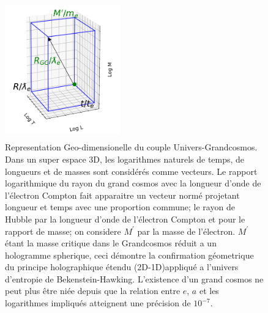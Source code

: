 \documentclass[a4paper,12pt]{article}
\begin{document}
\begin{appendix}
\begin{figure}
\centering
\includegraphics[width=5cm,height=6cm]{./figures/triaxis.png} 
\caption[Representation Geo-dimensionelle du couple Univers-Grandcosmos]{Representation Geo-dimensionelle du couple Univers-Grandcosmos. Dans un super espace 3D, les logarithmes naturels de temps, de longueurs et de masses sont considérés comme vecteurs. Le rapport logarithmique du rayon du grand cosmos avec la longueur d'onde de l'électron Compton fait apparaitre un vecteur normé projetant longueur et temps avec une proportion commune; le rayon de Hubble par la longueur d'onde de l'électron Compton et pour le rapport de masse; on considere $M^{\prime}$ par la masse de l'électron. $M^{\prime}$ étant la masse critique dans le Grandcosmos réduit a un hologramme spherique, ceci démontre la confirmation géometrique du principe holographique étendu (2D-1D)appliqué a l'univers d'entropie de Bekenstein-Hawking. L'existence d'un grand cosmos ne peut plus \^etre niée depuis que la relation entre $e$, $a$ et les logarithmes impliqués atteignent une précision de $10^{-7}$.}
\label{fig:1:figure1}
\end{figure}


\end{appendix}
\end{document}
